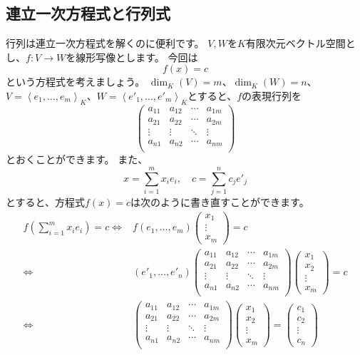 \subsection{連立一次方程式と行列式}

行列は連立一次方程式を解くのに便利です。
$V,W$を$K$有限次元ベクトル空間とし、$f:V\to W$を線形写像とします。
今回は
\[
  f(x)=c
\]
という方程式を考えましょう。
$\dim_K(V)=m$、$\dim_K(W)=n$、$V=\left<e_1,\dots,e_m\right>_K$、$W=\left<e'_1,\dots,e'_m\right>_K$とすると、$f$の表現行列を
\[
  \begin{pmatrix}
    a_{11} & a_{12} & \cdots & a_{1m}\\
    a_{21} & a_{22} & \cdots & a_{2m}\\
    \vdots & \vdots & \ddots & \vdots\\
    a_{n1} & a_{n2} & \cdots & a_{nm}\\
  \end{pmatrix}
\]
とおくことができます。
また、
\[
  x=\sum_{i=1}^mx_ie_i,\quad c=\sum_{j=1}^nc_je'_j
\]
とすると、方程式$f(x)=c$は次のように書き直すことができます。
\begin{align*}
  f\left(\sum_{i=1}^mx_ie_i\right)=c
  \iff&f(e_1,\dots,e_m)\begin{pmatrix}
    x_1\\\vdots\\x_m
  \end{pmatrix}=c\\
  \iff&(e'_1,\dots,e'_n)\begin{pmatrix}
    a_{11} & a_{12} & \cdots & a_{1m}\\
    a_{21} & a_{22} & \cdots & a_{2m}\\
    \vdots & \vdots & \ddots & \vdots\\
    a_{n1} & a_{n2} & \cdots & a_{nm}\\
  \end{pmatrix}
  \begin{pmatrix}
    x_1\\x_2\\\vdots\\x_m
  \end{pmatrix}=c\\
  \iff&\begin{pmatrix}
    a_{11} & a_{12} & \cdots & a_{1m}\\
    a_{21} & a_{22} & \cdots & a_{2m}\\
    \vdots & \vdots & \ddots & \vdots\\
    a_{n1} & a_{n2} & \cdots & a_{nm}\\
  \end{pmatrix}
  \begin{pmatrix}
    x_1\\x_2\\\vdots\\x_m
  \end{pmatrix}=
  \begin{pmatrix}
    c_1\\c_2\\\vdots\\c_n
  \end{pmatrix}
\end{align*}
